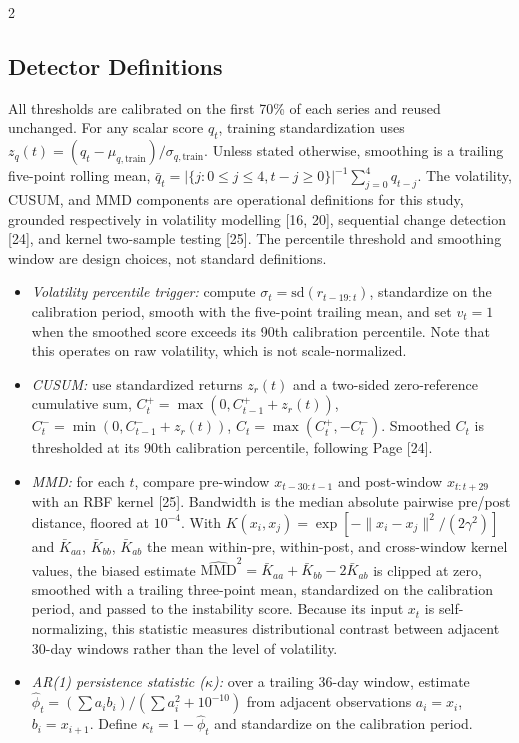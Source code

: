 \documentclass{book}
\begin{document}
\begin{multicols}{2}
\subsection{Detector Definitions}
All thresholds are calibrated on the first 70\% of each series and reused unchanged. For any scalar score $q_t$, training standardization uses $z_q(t)=(q_t-\mu_{q,\mathrm{train}})/\sigma_{q,\mathrm{train}}$. Unless stated otherwise, smoothing is a trailing five-point rolling mean, $\bar q_t=|\{j:0\leq j\leq4,t-j\geq0\}|^{-1}\sum_{j=0}^{4}q_{t-j}$. The volatility, CUSUM, and MMD components are operational definitions for this study, grounded respectively in volatility modelling [16, 20], sequential change detection [24], and kernel two-sample testing [25]. The percentile threshold and smoothing window are design choices, not standard definitions.
\begin{itemize}
\item \textit{Volatility percentile trigger:} compute $\sigma_t=\mathrm{sd}(r_{t-19:t})$, standardize on the calibration period, smooth with the five-point trailing mean, and set $v_t=1$ when the smoothed score exceeds its 90th calibration percentile. Note that this operates on raw volatility, which is not scale-normalized.
\item \textit{CUSUM:} use standardized returns $z_r(t)$ and a two-sided zero-reference cumulative sum, $C_t^+=\max(0,C_{t-1}^+ + z_r(t))$, $C_t^-=\min(0,C_{t-1}^- + z_r(t))$, $C_t=\max(C_t^+,-C_t^-)$. Smoothed $C_t$ is thresholded at its 90th calibration percentile, following Page [24].
\item \textit{MMD:} for each $t$, compare pre-window $x_{t-30:t-1}$ and post-window $x_{t:t+29}$ with an RBF kernel [25]. Bandwidth is the median absolute pairwise pre/post distance, floored at $10^{-4}$. With $K(x_i,x_j)=\exp[-\|x_i-x_j\|^2/(2\gamma^2)]$ and $\bar K_{aa}$, $\bar K_{bb}$, $\bar K_{ab}$ the mean within-pre, within-post, and cross-window kernel values, the biased estimate $\widehat{\mathrm{MMD}}^2=\bar K_{aa}+\bar K_{bb}-2\bar K_{ab}$ is clipped at zero, smoothed with a trailing three-point mean, standardized on the calibration period, and passed to the instability score. Because its input $x_t$ is self-normalizing, this statistic measures distributional contrast between adjacent 30-day windows rather than the level of volatility.
\item \textit{AR(1) persistence statistic ($\kappa$):} over a trailing 36-day window, estimate $\widehat\phi_t=(\sum a_i b_i)/(\sum a_i^2+10^{-10})$ from adjacent observations $a_i=x_i$, $b_i=x_{i+1}$. Define $\kappa_t=1-\widehat\phi_t$ and standardize on the calibration period.

\end{itemize}
\end{multicols}
\end{document}
